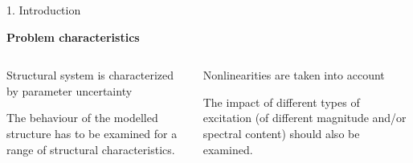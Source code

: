 \documentclass[10pt,xcolor = dvipsnames]{beamer}
\newcommand{\vc}[1]{\vspace*{#1cm}}
\newcommand{\Red}{\color{red}}
\begin{document}
\begin{frame}{1. Introduction}

\vc{-0.3}

{\bf Problem characteristics}

\vc{-0.2}\begin{columns}
%

\begin{block}{\small Structural system is characterized by parameter uncertainty}

\begin{figure}[t!]
\end{figure}

\small \centering The behaviour of the modelled structure has to be examined for a {\Red range of structural characteristics}.

\end{block}


\begin{block}{\small Nonlinearities are taken into account}

\begin{figure}[t!]
\end{figure}
%
\small \centering The impact of {\Red different types of excitation} (of different magnitude and/or spectral content) should also be examined.


\end{block}
\end{columns}
\end{frame}
\end{document}
